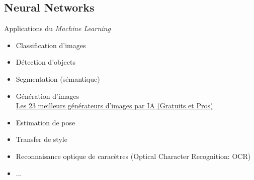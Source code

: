 \documentclass[11pt,serif,mathserif,compress,hyperref={colorlinks}]{beamer}
\begin{document}
\subsection{Neural Networks}

\begin{frame}{Applications du {\em Machine Learning}}

  \begin{tcolorbox}[title=Vision par ordinateur, add to width=7mm, left skip=-8mm, height=65mm]
    \begin{minipage}[t][][t]{.7\textwidth}
      \begin{itemize}
      \item<2-> Classification d'images
      \item<3-> Détection d'objects 
      \item<4-> Segmentation (sémantique)
      \item<5-> Génération d'images\\
        {\tiny \href{https://www.leptidigital.fr/productivite/meilleurs-generateurs-images-ia-30857/}{Les 23 meilleurs générateurs d’images par IA (Gratuits et Pros)}}
      \item<6-> Estimation de pose
      \item<7-> Transfer de style
      \item<8-> Reconnaisance optique de caracètres ({\small Optical Character Recognition: OCR})
      \item<8-> ...
      \end{itemize}
    \end{minipage}%
    \hspace*{-10mm}\begin{minipage}[t][][b]{.4\textwidth}

\end{minipage}
\end{tcolorbox}
\end{frame}
\end{document}
